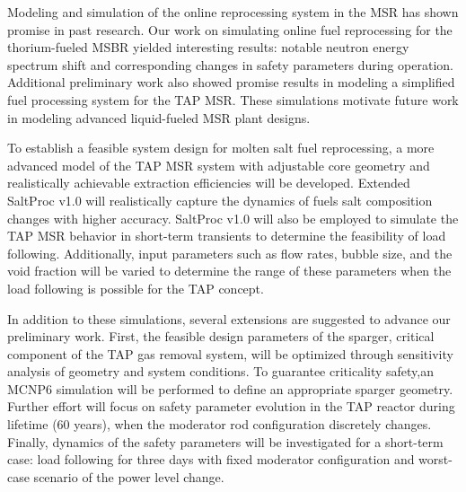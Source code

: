 Modeling and simulation of the online reprocessing system in the \gls{MSR} 
has shown promise in past research. Our work on simulating online fuel  
reprocessing for the thorium-fueled \gls{MSBR} yielded interesting results: 
notable neutron energy spectrum shift and corresponding changes in safety 
parameters during operation. Additional preliminary work also showed promise 
results in modeling a simplified fuel processing system for the \gls{TAP} 
\gls{MSR}. These simulations motivate future work in modeling advanced 
liquid-fueled \gls{MSR} plant designs.

To establish a feasible system design for molten salt fuel reprocessing, a 
more advanced model of the \gls{TAP} \gls{MSR} system with adjustable core 
geometry and realistically achievable extraction efficiencies will be 
developed. Extended SaltProc v1.0 will realistically capture the dynamics of 
fuels salt composition changes with higher accuracy. SaltProc v1.0 will also 
be employed to simulate the \gls{TAP} \gls{MSR} behavior in short-term 
transients to determine the feasibility of load following. Additionally, input 
parameters such as flow rates, bubble size, and the void fraction will be 
varied to determine the range of these parameters when the load following is 
possible for the \gls{TAP} concept.

In addition to these simulations, several extensions are suggested to 
advance our preliminary work. First, the feasible design parameters of the 
sparger, critical component of the \gls{TAP} gas removal system, will be 
optimized through sensitivity analysis of geometry and system conditions. To 
guarantee criticality safety,an MCNP6 simulation will be performed to define 
an appropriate sparger geometry. Further effort will focus on safety  
parameter evolution in the \gls{TAP} reactor during lifetime (60 years),  
when the moderator rod configuration discretely changes. Finally, dynamics of 
the safety parameters will be investigated for a short-term case: load 
following for three days with fixed moderator configuration and worst-case 
scenario of the power level change. 

